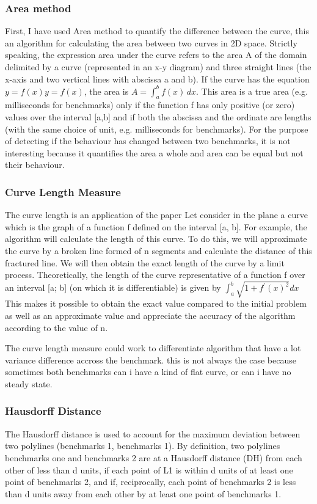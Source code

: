 \documentclass{article}
\begin{document}
\subsubsection{Area method}

First, I have used Area \cite{jekel2019similarity} method to quantify the difference between the curve, this an algorithm for calculating the area between two curves in 2D space.
Strictly speaking, the expression area under the curve refers to the area A of the domain delimited by a curve (represented in an x-y diagram) and three straight lines (the x-axis and two vertical lines with abscissa a and b). If the curve has the equation $y=f(x) y=f(x)$, the area is $A=\int _{a}^{b}f(x)\, {d} x$. This area is a true area (e.g. milliseconds for benchmarks) only if the function f has only positive (or zero) values over the interval [a,b] and if both the abscissa and the ordinate are lengths (with the same choice of unit, e.g. milliseconds for benchmarks).
For the purpose of detecting if the behaviour has changed between two benchmarks, it is not interesting because it quantifies the area a whole and area can be equal but not their behaviour.

\subsubsection{Curve Length Measure}

The curve length is an application of the paper \cite{moran1966measuring}
Let consider in the plane a curve which is the graph of a function f defined on the interval [a, b]. For example, the algorithm will calculate the length of this curve. To do this, we will approximate the curve by a broken line formed of n segments and calculate the distance of this fractured line. We will then obtain the exact length of the curve by a limit process.
Theoretically, the length of the curve representative of a
function f over an interval [a; b] (on which it is differentiable) is given by $\int_{a}^{b} \sqrt{1+f^{\prime}(x)^{2}} d x$
This makes it possible to obtain the exact value compared to the initial problem as well as an approximate value and appreciate the accuracy of the algorithm according to the value of n.

The curve length measure could work to differentiate algorithm that have a lot variance difference accross the benchmark. this is not always the case because sometimes both benchmarks can i have a kind of flat curve, or can i have no steady state.
\subsubsection{Hausdorff Distance }
The Hausdorff distance \cite{belogay1997calculating} is used to account for the maximum deviation between two polylines (benchmarks 1, benchmarks 1). By definition, two polylines benchmarks one and benchmarks 2 are at a Hausdorff distance (DH) from each other of less than d units, if each point of L1 is within d units of at least one point of benchmarks 2, and if, reciprocally, each point of benchmarks 2 is less than d units away from each other by at least one point of benchmarks 1.
\end{document}
